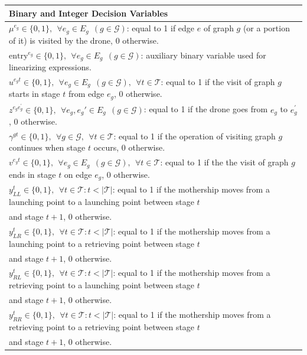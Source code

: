 \documentclass[10pt,a4paper]{elsarticle}
\begin{document}
\begin{table}[h!]
\scriptsize
\centering
\begin{tabular}{|l|}
\hline 
\textbf{Binary and Integer Decision Variables}\\
\hline
$\mu^{e_g} \in \{0,1\}, \:\: \forall e_g \in E_g \:\:(g \in \mathcal{G})$: equal to 1 if edge $e$ of graph $g$ (or a portion of it) is visited by the drone, 0 otherwise.\\
$\text{entry}^{e_g} \in \{0,1\}, \:\: \forall e_g \in E_g\:\: (g \in \mathcal{G})$: auxiliary binary variable used for linearizing expressions.\\
$u^{e_g t} \in \{0,1\}, \:\: \forall e_g \in E_g \:\: (g \in \mathcal{G}), \:\: \forall t \in \mathcal T$: equal to 1 if the visit of graph $g$ starts in stage $t$ from edge $e_g$, 0 otherwise.\\
$z^{e_{g}e^{'}_{g}} \in \{0,1\}, \:\: \forall e_g, e_g' \in E_g\:\: (g \in \mathcal{G})$: equal to 1 if the drone goes from $e_g$ to $e^{'}_{g}$, 0 otherwise.\\
$\gamma^{gt}\in \{0,1\}, \:\: \forall g\in\mathcal G,\:\:\forall t\in \mathcal T$: equal to 1 if the operation of visiting graph $g$ continues when stage $t$ occurs, 0 otherwise.\\
$v^{e_g t} \in \{0,1\}, \:\: \forall e_g \in E_g \:\: (g \in \mathcal{G}), \:\: \forall t \in \mathcal T$: equal to 1 if the the visit of graph $g$ ends in stage $t$ on edge $e_g$, 0 otherwise.\\
$y_{LL}^t \in \{0,1\},  \:\: \forall t \in \mathcal T:t<|\mathcal T|$: equal to 1 if the mothership moves from a launching point to a launching point between stage $t$\\ \hspace*{1cm} and stage $t+1$, 0 otherwise.\\
$y_{LR}^t \in \{0,1\},  \:\: \forall t \in \mathcal T:t<|\mathcal T|$: equal to 1 if the mothership moves from a launching point to a retrieving point between stage $t$\\ \hspace*{1cm} and stage $t+1$, 0 otherwise.\\
$y_{RL}^t \in \{0,1\},  \:\: \forall t \in \mathcal T:t<|\mathcal T|$: equal to 1 if the mothership moves from a retrieving point to a launching point between stage $t$\\ \hspace*{1cm} and stage $t+1$, 0 otherwise.\\
$y_{RR}^t \in \{0,1\},  \:\: \forall t \in \mathcal T:t<|\mathcal T|$: equal to 1 if the mothership moves from a retrieving point to a retrieving point between stage $t$\\ \hspace*{1cm} and stage $t+1$, 0 otherwise.\\

\end{tabular}
\end{table}
\end{document}

